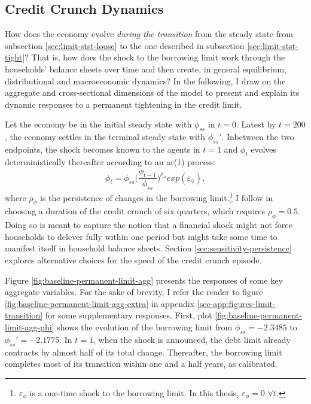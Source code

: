 \documentclass[12pt]{article} %
\numberwithin{equation}{section} %
\numberwithin{figure}{section}
\numberwithin{table}{section}
\begin{document}

\subsection{Credit Crunch Dynamics}
\label{sec:limit-transition}

How does the economy evolve \textit{during the transition} from the steady state from subsection \ref{sec:limit-stst-loose} to the one described in subsection \ref{sec:limit-stst-tight}? That is, how does the shock to the borrowing limit work through the households' balance sheets over time and then create, in general equilibrium, distributional and macroeconomic dynamics? In the following, I draw on the aggregate and cross-sectional dimensions of the model to present and explain its dynamic responses to a permanent tightening in the credit limit.

Let the economy be in the initial steady state with $\phi_{ss}$ in $t=0$. Latest by $t=200$, the economy settles in the terminal steady state with $\phi_{ss}'$. Inbetween the two endpoints, the shock becomes known to the agents in $t=1$ and $\phi_t$ evolves deterministically thereafter according to an \Gls{ar}(1) process:
\begin{equation}
    \phi_t = \phi_{ss} \Bigg( \frac{\phi_{t-1}}{\phi_{ss}} \Bigg)^{\rho_{\phi}} exp(\varepsilon_{\phi}), \label{eq:borrowing-limit-process}
\end{equation}
where $\rho_{\phi}$ is the persistence of changes in the borrowing limit.\footnote{$\varepsilon_{\phi}$ is a one-time shock to the borrowing limit. In this thesis, $\varepsilon_{\phi} = 0$ $\forall t$.} I follow \textcite{gl2017} in choosing a duration of the credit crunch of six quarters, which requires $\rho_{\phi} = 0.5$. Doing so is meant to capture the notion that a financial shock might not force households to delever fully within one period but might take some time to manifest itself in household balance sheets. Section \ref{sec:sensitivity-persistence} explores alternative choices for the speed of the credit crunch episode. %

Figure \ref{fig:baseline-permanent-limit-agg} presents the responses of some key aggregate variables. For the sake of brevity, I refer the reader to figure \ref{fig:baseline-permanent-limit-agg-extra} in appendix \ref{sec-app:figures-limit-transition} for some supplementary responses. First, plot \ref{fig:baseline-permanent-limit-agg-phi} shows the evolution of the borrowing limit from $\phi_{ss} = -2.3485$ to $\phi_{ss}' = -2.1775$. In $t=1$, when the shock is announced, the debt limit already contracts by almost half of its total change. Thereafter, the borrowing limit completes most of its transition within one and a half years, as calibrated.
\end{document}
